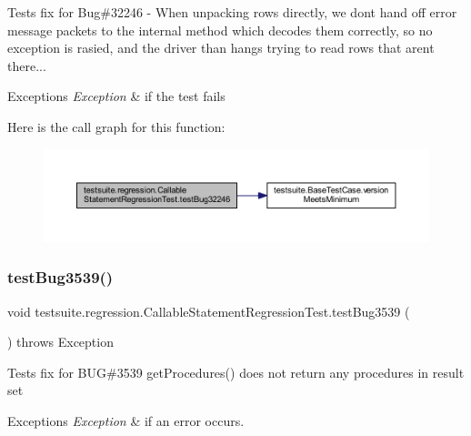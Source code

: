 Tests fix for Bug\#32246 -\/ When unpacking rows directly, we don\textquotesingle{}t hand off error message packets to the internal method which decodes them correctly, so no exception is rasied, and the driver than hangs trying to read rows that aren\textquotesingle{}t there...


\begin{DoxyExceptions}{Exceptions}
{\em Exception} & if the test fails \\
\hline
\end{DoxyExceptions}
Here is the call graph for this function\+:
\nopagebreak
\begin{figure}[H]
\begin{center}
\leavevmode
\includegraphics[width=350pt]{classtestsuite_1_1regression_1_1_callable_statement_regression_test_ae409019fbd71b0dbfac43b3a30ed326e_cgraph}
\end{center}
\end{figure}
\mbox{\label{classtestsuite_1_1regression_1_1_callable_statement_regression_test_a6c39c2788d35a24b2933541c30b8738d}} 
\subsubsection{\texorpdfstring{test\+Bug3539()}{testBug3539()}}
{\footnotesize\ttfamily void testsuite.\+regression.\+Callable\+Statement\+Regression\+Test.\+test\+Bug3539 (\begin{DoxyParamCaption}{ }\end{DoxyParamCaption}) throws Exception}

Tests fix for B\+UG\#3539 get\+Procedures() does not return any procedures in result set


\begin{DoxyExceptions}{Exceptions}
{\em Exception} & if an error occurs. \\
\hline
\end{DoxyExceptions}
\mbox{\label{classtestsuite_1_1regression_1_1_callable_statement_regression_test_a060bce79977b8f767964814bd7f23f80}} 
